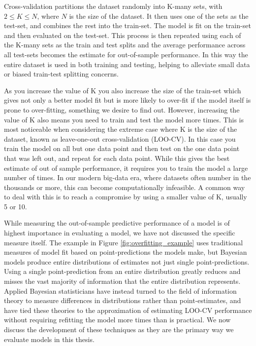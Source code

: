Cross-validation partitions the dataset randomly into K-many sets, with $2 \leq K \leq N$, where $N$ is the size of the dataset. It then uses one of the sets as the test-set, and combines the rest into the train-set. The model is fit on the train-set and then evaluated on the test-set. This process is then repeated using each of the K-many sets as the train and test splits and the average performance across all test-sets becomes the estimate for out-of-sample performance. In this way the entire dataset is used in both training and testing, helping to alleviate small data or biased train-test splitting concerns.

As you increase the value of K you also increase the size of the train-set which gives not only a better model fit but is more likely to over-fit if the model itself is prone to over-fitting, something we desire to find out. However, increasing the value of K also means you need to train and test the model more times. This is most noticeable when considering the extreme case where K is the size of the dataset, known as leave-one-out cross-validation (LOO-CV). In this case you train the model on all but one data point and then test on the one data point that was left out, and repeat for each data point. While this gives the best estimate of out of sample performance, it requires you to train the model a large number of times. In our modern big-data era, where datasets often number in the thousands or more, this can become computationally infeasible. A common way to deal with this is to reach a compromise by using a smaller value of K, usually 5 or 10.

While measuring the out-of-sample predictive performance of a model is of highest importance in evaluating a model, we have not discussed the specific measure itself. The example in Figure \ref{fig:overfitting_example} uses traditional measures of model fit based on point-predictions the models make, but Bayesian models produce entire distributions of estimates not just single point-predictions. Using a single point-prediction from an entire distribution greatly reduces and misses the vast majority of information that the entire distribution represents. Applied Bayesian statisticians have instead turned to the field of information theory to measure differences in distributions rather than point-estimates, and have tied these theories to the approximation of estimating LOO-CV performance without requiring refitting the model more times than is practical. We now discuss the development of these techniques as they are the primary way we evaluate models in this thesis.

